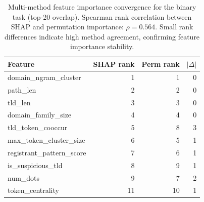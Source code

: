 \begin{table}[htbp]
\centering
\caption{Multi-method feature importance convergence for the binary task (top-20 overlap). Spearman rank correlation between SHAP and permutation importance: $\rho=0.564$. Small rank differences indicate high method agreement, confirming feature importance stability.}
\label{tab:convergence_binary}
\footnotesize
\begin{tabular}{lrrr}
\toprule
Feature & SHAP rank & Perm rank & $|\Delta|$ \\
\midrule
domain\_ngram\_cluster & 1 & 1 & 0 \\
path\_len & 2 & 2 & 0 \\
tld\_len & 3 & 3 & 0 \\
domain\_family\_size & 4 & 4 & 0 \\
tld\_token\_cooccur & 5 & 8 & 3 \\
max\_token\_cluster\_size & 6 & 5 & 1 \\
registrant\_pattern\_score & 7 & 6 & 1 \\
is\_suspicious\_tld & 8 & 9 & 1 \\
num\_dots & 9 & 7 & 2 \\
token\_centrality & 11 & 10 & 1 \\
\bottomrule
\end{tabular}
\end{table}